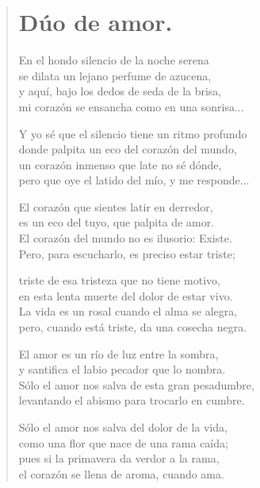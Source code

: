 \documentclass[11pt, portrait, twoside, notitlepage, openright]{book}
\begin{document}
\newpage
\begin{verse}
\begin{center}
\section{Dúo de amor.}
\end{center}
En el hondo silencio de la noche serena\\
se dilata un lejano perfume de azucena,\\
y aquí, bajo los dedos de seda de la brisa,\\
mi corazón se ensancha como en una sonrisa...
\newline

Y yo sé que el silencio tiene un ritmo profundo\\
donde palpita un eco del corazón del mundo,\\
un corazón inmenso que late no sé dónde,\\
pero que oye el latido del mío, y me responde...
\newline

El corazón que sientes latir en derredor,\\
es un eco del tuyo, que palpita de amor.\\
El corazón del mundo no es ilusorio: Existe.\\
Pero, para escucharlo, es preciso estar triste;
\newline

triste de esa tristeza que no tiene motivo,\\
en esta lenta muerte del dolor de estar vivo.\\
La vida es un rosal cuando el alma se alegra,\\
pero, cuando está triste, da una cosecha negra.
\newline

El amor es un río de luz entre la sombra,\\
y santifica el labio pecador que lo nombra.\\
Sólo el amor nos salva de esta gran pesadumbre,\\
levantando el abismo para trocarlo en cumbre.
\newline

Sólo el amor nos salva del dolor de la vida,\\
como una flor que nace de una rama caída;\\
pues si la primavera da verdor a la rama,\\
el corazón se llena de aroma, cuando ama.
\newline


\end{verse}
\end{document}
